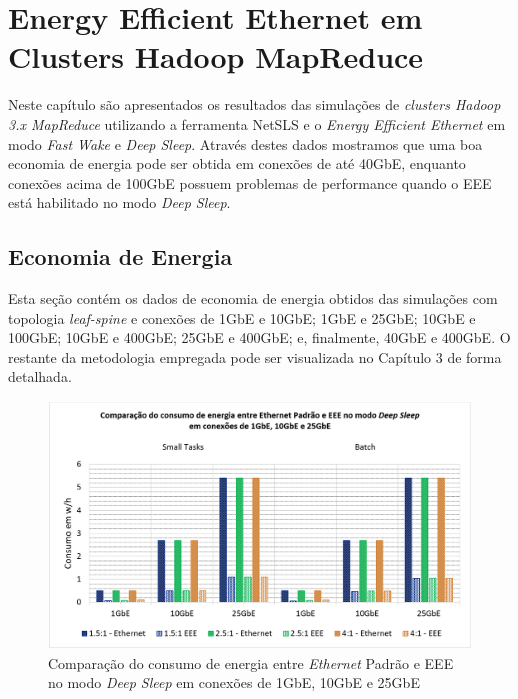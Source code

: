 \chapter{Energy Efficient Ethernet em Clusters Hadoop MapReduce}

Neste capítulo são apresentados os resultados das simulações de \emph{clusters Hadoop 3.x MapReduce} utilizando a ferramenta NetSLS e o \emph{Energy Efficient Ethernet} em modo \emph{Fast Wake} e \emph{Deep Sleep}. Através destes dados mostramos que uma boa economia de energia pode ser obtida em conexões de até 40GbE, enquanto conexões acima de 100GbE possuem problemas de performance quando o EEE está habilitado no modo \emph{Deep Sleep}.

\section{Economia de Energia}

Esta seção contém os dados de economia de energia obtidos das simulações com topologia \emph{leaf-spine} e conexões de 1GbE e 10GbE; 1GbE e 25GbE; 10GbE e 100GbE; 10GbE e 400GbE; 25GbE e 400GbE; e, finalmente, 40GbE e 400GbE. O restante da metodologia empregada pode ser visualizada no Capítulo 3 de forma detalhada.

\begin{figure}[htp]
    \centering
    \includegraphics[width=16cm]{4-EEEHadoop/Image1_EEEConsumption1-10-25.PNG}
    \caption{\centering Comparação do consumo de energia entre \emph{Ethernet} Padrão e EEE no modo \emph{Deep Sleep} em conexões de 1GbE, 10GbE e 25GbE}
    \label{fig:EEEConsumption1-10-25}
\end{figure}

